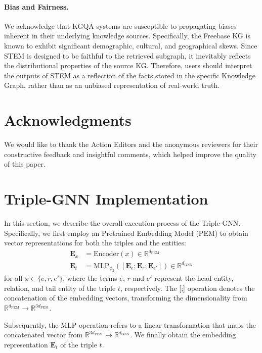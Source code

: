\documentclass[11pt]{article}
\begin{document}
\paragraph{Bias and Fairness.}
We acknowledge that KGQA systems are susceptible to propagating biases inherent in their underlying knowledge sources. Specifically, the Freebase KG is known to exhibit significant demographic, cultural, and geographical skews. Since STEM is designed to be faithful to the retrieved subgraph, it inevitably reflects the distributional properties of the source KG. Therefore, users should interpret the outputs of STEM as a reflection of the facts stored in the specific Knowledge Graph, rather than as an unbiased representation of real-world truth. 

\section*{Acknowledgments}
We would like to thank the Action Editors and the anonymous reviewers for their constructive feedback and insightful comments, which helped improve the quality of this paper.


\newpage
\appendix

\section{Triple-GNN Implementation}
\label{sec:tgnn}

In this section, we describe the overall execution process of the Triple-GNN. Specifically, we first employ an Pretrained Embedding Model (PEM) to obtain vector representations for both the triples and the entities:
\begin{align}
    \mathbf{E}_x &= \text{Encoder}(x) \in \mathbb{R}^{d_{\text{PEM}}} \\
    \mathbf{E}_t &= \text{MLP}_{\phi_2}([\mathbf{E}_{e}; \mathbf{E}_{r}; \mathbf{E}_{e'}]) \in \mathbb{R}^{d_{\text{GNN}}}
\end{align}
for all \(x \in \{e, r, e'\}\), where the terms $e$, $r$ and $e'$ represent the head entity, relation, and tail entity of the triple $t$, respectively. The [;] operation denotes the concatenation of the embedding vectors, transforming the dimensionality from $\mathbb{R}^{d_\text{PEM}} \rightarrow \mathbb{R}^{3d_\text{PEM}}$. 

Subsequently, the MLP operation refers to a linear transformation that maps the concatenated vector from $\mathbb{R}^{3d_{\text{PEM}}}\rightarrow\mathbb{R}^{d_\text{GNN}}$. We finally obtain the embedding representation $\mathbf{E}_t$ of the triple $t$.
\end{document}
